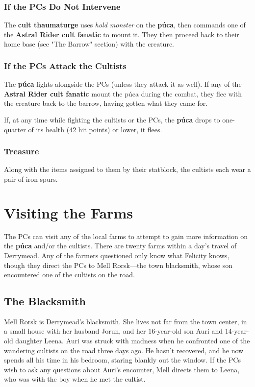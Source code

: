 \documentclass[10pt,a4paper,twoside,bg=print,twocolumn,openany,nodeprecatedcode]{dndbook}
\begin{document}
\subsubsection{If the PCs Do Not Intervene}
The \textbf{cult thaumaturge} uses \textit{hold monster} on the \textbf{púca}, then commands one of the \textbf{Astral Rider cult fanatic} to mount it. They then proceed back to their home base (see "The Barrow" section) with the creature.

\subsubsection{If the PCs Attack the Cultists}
The \textbf{púca} fights alongside the PCs (unless they attack it as well). If any of the \textbf{Astral Rider cult fanatic} mount the púca during the combat, they flee with the creature back to the barrow, having gotten what they came for.

If, at any time while fighting the cultists or the PCs, the \textbf{púca} drops to one-quarter of its health (42 hit points) or lower, it flees.

\subsubsection{Treasure}
Along with the items assigned to them by their statblock, the cultists each wear a pair of iron spurs.

\section{Visiting the Farms}
The PCs can visit any of the local farms to attempt to gain more information on the \textbf{púca} and/or the cultists. There are twenty farms within a day's travel of Derrymead. Any of the farmers questioned only know what Felicity knows, though they direct the PCs to Mell Rorsk—the town blacksmith, whose son encountered one of the cultists on the road.

\subsection{The Blacksmith}
Mell Rorsk is Derrymead's blacksmith. She lives not far from the town center, in a small house with her husband Jorun, and her 16-year-old son Auri and 14-year-old daughter Leena. Auri was struck with madness when he confronted one of the wandering cultists on the road three days ago. He hasn't recovered, and he now spends all his time in his bedroom, staring blankly out the window. If the PCs wish to ask any questions about Auri's encounter, Mell directs them to Leena, who was with the boy when he met the cultist.
\end{document}
